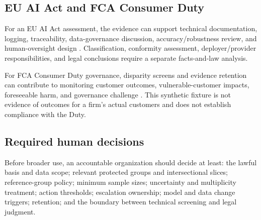 \subsection{EU AI Act and FCA Consumer Duty}

For an EU AI Act assessment, the evidence can support technical documentation, logging,
traceability, data-governance discussion, accuracy/robustness review, and human-oversight design
\citep{eu_ai_act}. Classification, conformity assessment, deployer/provider responsibilities, and
legal conclusions require a separate facts-and-law analysis.

For FCA Consumer Duty governance, disparity screens and evidence retention can contribute to
monitoring customer outcomes, vulnerable-customer impacts, foreseeable harm, and governance
challenge \citep{fca_consumer_duty_2026}. This synthetic fixture is not evidence of outcomes for a
firm's actual customers and does not establish compliance with the Duty.

\subsection{Required human decisions}

Before broader use, an accountable organization should decide at least: the lawful basis and data
scope; relevant protected groups and intersectional slices; reference-group policy; minimum sample
sizes; uncertainty and multiplicity treatment; action thresholds; escalation ownership; model and
data change triggers; retention; and the boundary between technical screening and legal judgment.
